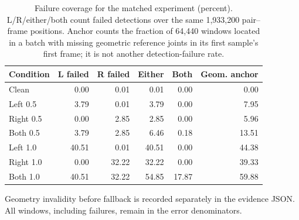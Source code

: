 \begin{table}[htbp]
\centering
\caption{Failure coverage for the matched experiment (percent). L/R/either/both count failed detections over the same 1,933,200 pair--frame positions. Anchor counts the fraction of 64,440 windows located in a batch with missing geometric reference joints in its first sample's first frame; it is not another detection-failure rate.}
\label{tab:c07_coverage}
\small
\setlength{\tabcolsep}{4pt}
\begin{tabular}{lrrrrr}
\toprule
Condition & L failed & R failed & Either & Both & Geom. anchor \\
\midrule
Clean & 0.00 & 0.01 & 0.01 & 0.00 & 0.00 \\
Left 0.5 & 3.79 & 0.01 & 3.79 & 0.00 & 7.95 \\
Right 0.5 & 0.00 & 2.85 & 2.85 & 0.00 & 5.96 \\
Both 0.5 & 3.79 & 2.85 & 6.46 & 0.18 & 13.51 \\
Left 1.0 & 40.51 & 0.01 & 40.51 & 0.00 & 44.38 \\
Right 1.0 & 0.00 & 32.22 & 32.22 & 0.00 & 39.33 \\
Both 1.0 & 40.51 & 32.22 & 54.85 & 17.87 & 59.88 \\
\bottomrule
\end{tabular}
\par\smallskip\begin{minipage}{\linewidth}\footnotesize Geometry invalidity before fallback is recorded separately in the evidence JSON. All windows, including failures, remain in the error denominators.\end{minipage}
\end{table}

